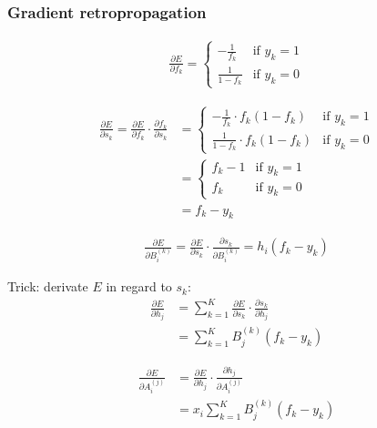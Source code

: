 \subsubsection*{Gradient retropropagation}


\begin{align}
	\frac{ \partial E } { \partial f_k } = 
		\left\{
		    \begin{array}{ll}
		        - \frac{1}{f_k} & \mbox{if } y_k =1 \\
		        \frac{1}{1 - f_k} & \mbox{if } y_k =0
		    \end{array}
		\right.
\end{align}


\begin{align}
	\frac{ \partial E } { \partial s_k } 
		=  
		\frac{ \partial E } { \partial f_k } \cdot \frac{ \partial f_k } { \partial s_k } 
		&=
		\left\{
		    \begin{array}{ll}
		        - \frac{1}{f_k} \cdot f_k (1 - f_k)& \mbox{if } y_k =1 \\
		        \frac{1}{1 - f_k} \cdot f_k (1 - f_k)& \mbox{if } y_k =0
		    \end{array}
		\right. \\
		&=
		\left\{
		    \begin{array}{ll}
		       f_k - 1 & \mbox{if } y_k =1 \\
		       f_k & \mbox{if } y_k =0
		    \end{array}
		\right. \\
		&= f_k - y_k
\end{align}



\begin{align}
	\frac{\partial E}{\partial B_i^{(k)}} 
	= 
	\frac{\partial E}{\partial s_k} \cdot \frac{\partial s_k}{\partial B_i^{(k)}} 
	= 
	h_i (f_k - y_k)
\end{align}


Trick: derivate $E$ in regard to $s_k$:
\begin{align}
	\frac{\partial E}{\partial h_j} 
	&= 
	\sum_{k=1}^K \frac{\partial E}{\partial s_k} \cdot \frac{\partial s_k}{\partial h_j} \\
	&= 
	\sum_{k=1}^K B_j^{(k)} (f_k - y_k)
\end{align}


\begin{align}
	\frac{\partial E}{\partial A_i^{(j)}} 
	&= 
	\frac{\partial E}{\partial h_j} \cdot \frac{\partial h_j}{\partial A_i^{(j)}} \\
	&= 
	x_i \sum_{k=1}^K B_j^{(k)} (f_k - y_k)
\end{align}



